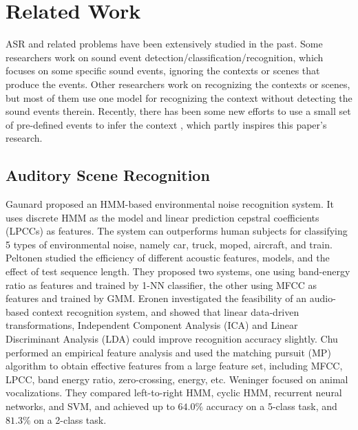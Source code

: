 \section{Related Work}
\label{sec:related}


ASR and related problems have been extensively studied in the past.
Some researchers work on sound event detection/classification/recognition,
which focuses on some specific sound events, ignoring the
contexts or scenes that produce the events. Other researchers
work on recognizing the contexts or scenes, but most of them use one model for
recognizing the context without detecting the sound events therein.
Recently, there has been some new efforts to use a
small set of pre-defined events to infer the context \cite{heittola2010audio},
which partly inspires this paper's research.

\subsection{Auditory Scene Recognition}
Gaunard \et\cite{679661} proposed an HMM-based environmental noise recognition system. It uses discrete HMM as the model and linear prediction
cepstral coefficients (LPCCs) as features.
The system can outperforms human subjects for classifying 5 types
of environmental noise, namely car, truck, moped, aircraft, and train.
Peltonen \et\cite{5745009} studied the efficiency of different acoustic
features, models, and the effect of test sequence length.
They proposed two systems, %
one using band-energy ratio as features and trained by 1-NN classifier,
the other using MFCC as features and trained by GMM.
Eronen \et\cite{1561288} investigated the feasibility of an audio-based
context recognition system, and showed that linear data-driven transformations,
\ie Independent Component Analysis (ICA) and Linear Discriminant Analysis (LDA)
could improve recognition accuracy slightly.
Chu \et\cite{5109766} performed an empirical feature analysis and
used the matching pursuit (MP) algorithm to obtain effective features from
a large feature set, including MFCC, LPCC, band energy ratio,
zero-crossing, energy, etc.
Weninger \et\cite{5946409} focused on animal vocalizations.
They compared left-to-right HMM, cyclic HMM, recurrent neural networks,
and SVM, and achieved up to $64.0\%$ accuracy on a 5-class task,
and $81.3\%$ on a 2-class task.

